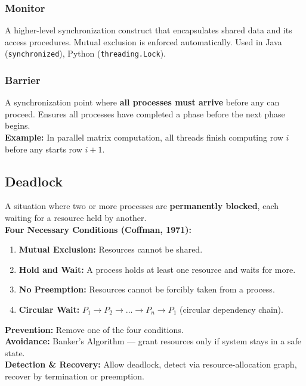 \documentclass[11pt,a4paper]{article}
\begin{document}
\subsubsection{Monitor}
A higher-level synchronization construct that encapsulates shared data and its access procedures. Mutual exclusion is enforced automatically. Used in Java (\texttt{synchronized}), Python (\texttt{threading.Lock}).

\subsubsection{Barrier}
\begin{definitionbox}
A synchronization point where \textbf{all processes must arrive} before any can proceed. Ensures all processes have completed a phase before the next phase begins.\\[4pt]
\textbf{Example:} In parallel matrix computation, all threads finish computing row $i$ before any starts row $i{+}1$.
\end{definitionbox}

\subsection{Deadlock}
\begin{alertbox}[Deadlock]
A situation where two or more processes are \textbf{permanently blocked}, each waiting for a resource held by another.\\[4pt]
\textbf{Four Necessary Conditions (Coffman, 1971):}
\begin{enumerate}[leftmargin=*, itemsep=2pt]
  \item \textbf{Mutual Exclusion:} Resources cannot be shared.
  \item \textbf{Hold and Wait:} A process holds at least one resource and waits for more.
  \item \textbf{No Preemption:} Resources cannot be forcibly taken from a process.
  \item \textbf{Circular Wait:} $P_1 \to P_2 \to \ldots \to P_n \to P_1$ (circular dependency chain).
\end{enumerate}
\textbf{Prevention:} Remove one of the four conditions.\\
\textbf{Avoidance:} Banker's Algorithm --- grant resources only if system stays in a safe state.\\
\textbf{Detection \& Recovery:} Allow deadlock, detect via resource-allocation graph, recover by termination or preemption.
\end{alertbox}
\end{document}
